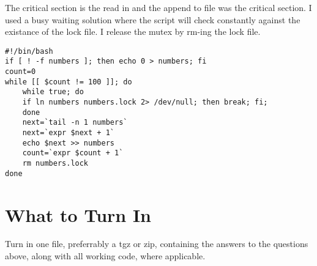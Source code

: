 \documentclass[12pt]{article}
\begin{document}
\begin{enumerate}
The critical section is the read in and the append to file was the critical
section. I used a busy waiting solution where the script will check constantly
against the existance of the lock file. I release the mutex by rm-ing the
lock file.

\begin{Verbatim}
#!/bin/bash
if [ ! -f numbers ]; then echo 0 > numbers; fi 
count=0
while [[ $count != 100 ]]; do
    while true; do
	if ln numbers numbers.lock 2> /dev/null; then break; fi;
    done
    next=`tail -n 1 numbers`
    next=`expr $next + 1`
    echo $next >> numbers
    count=`expr $count + 1`
    rm numbers.lock
done
\end{Verbatim}

\end{enumerate}

\section{What to Turn In}
Turn in one file, preferrably a tgz or zip, containing the answers to
the questions above, along with all working code, where applicable.
\end{document}
